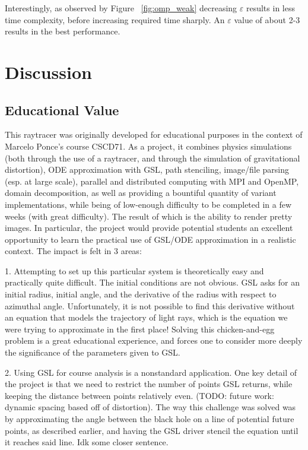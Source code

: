Interestingly, as observed by Figure ~\ref{fig:omp_weak} decreasing $\varepsilon$ results in less time complexity, before increasing required time sharply. An $\varepsilon$ value of about 2-3 results in the best performance.



\section{Discussion}
\label{sec:disc}

\subsection{Educational Value}


This raytracer was originally developed for educational purposes in the context of Marcelo Ponce's course CSCD71. As a project, it combines physics simulations (both through the use of a raytracer, and through the simulation of gravitational distortion), ODE approximation with GSL, path stenciling, image/file parsing (esp. at large scale), parallel and distributed computing with MPI and OpenMP, domain decomposition, as well as providing a bountiful quantity of variant implementations, while being of low-enough difficulty to be completed in a few weeks (with great difficulty). The result of which is the ability to render pretty images. In particular, the project would provide potential students an excellent opportunity to learn the practical use of GSL/ODE approximation in a realistic context. The impact is felt in 3 areas:

1. Attempting to set up this particular system is theoretically easy and practically quite difficult. The initial conditions are not obvious. GSL asks for an initial radius, initial angle, and the derivative of the radius with respect to azimuthal angle. Unfortunately, it is not possible to find this derivative without an equation that models the trajectory of light rays, which is the equation we were trying to approximate in the first place! Solving this chicken-and-egg problem is a great educational experience, and forces one to consider more deeply the significance of the parameters given to GSL. 

2. Using GSL for course analysis is a nonstandard application. One key detail of the project is that we need to restrict the number of points GSL returns, while keeping the distance between points relatively even. (TODO: future work: dynamic spacing based off of distortion). The way this challenge was solved was by approximating the angle between the black hole on a line of potential future points, as described earlier, and having the GSL driver stencil the equation until it reaches said line. Idk some closer sentence.

